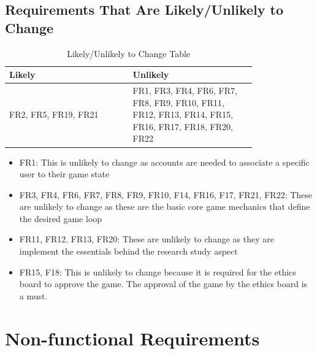 \documentclass{article}
\begin{document}
\subsection{Requirements That Are Likely/Unlikely to Change}
\begin{table}[H]
  \centering
  \begin{tabular}{|p{0.40\linewidth} | p{0.40\linewidth}|}
  \hline
       Likely & Unlikely \\
       \hline
       FR2, FR5, FR19, FR21 & FR1, FR3, FR4, FR6, FR7, FR8, FR9, FR10, FR11, FR12, FR13, FR14, FR15, FR16, FR17, FR18, FR20, FR22    \\
       \hline
  \end{tabular}
  \caption{Likely/Unlikely to Change Table}
  \label{tab:my_label}
\end{table}
\begin{itemize}
  \item FR1: This is unlikely to change as accounts are needed to associate a specific user to their game state
  \item FR3, FR4, FR6, FR7, FR8, FR9, FR10, F14, FR16, F17, FR21, FR22: These are unlikely to change as these are the basic core game mechanics that define the desired game loop
  \item FR11, FR12, FR13, FR20: These are unlikely to change as they are implement the essentials behind the research study aspect
  \item FR15, F18: This is unlikely to change because it is required for the ethics board to approve the game. The approval of the game by the ethics board is a must.
  
\end{itemize}
\section{Non-functional Requirements}
\end{document}
